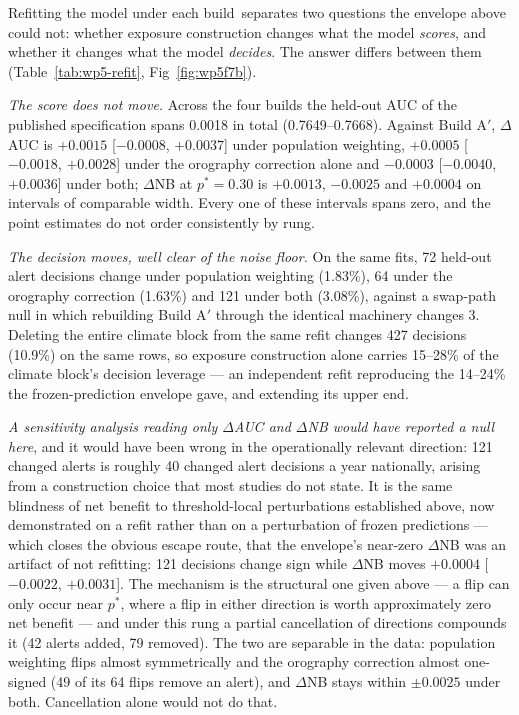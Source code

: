 Refitting the model under each build\,\REBUILD{} separates two questions the envelope above could not: whether exposure construction changes what the model \emph{scores}, and whether it changes what the model \emph{decides}. The answer differs between them (Table~\ref{tab:wp5-refit}, Fig~\ref{fig:wp5f7b}).

\emph{The score does not move.} Across the four builds the held-out AUC of the published specification spans 0.0018 in total (0.7649--0.7668). Against Build A$'$, $\Delta$AUC is $+0.0015$ [$-0.0008$, $+0.0037$] under population weighting, $+0.0005$ [$-0.0018$, $+0.0028$] under the orography correction alone and $-0.0003$ [$-0.0040$, $+0.0036$] under both; $\Delta$NB at $p^*=0.30$ is $+0.0013$, $-0.0025$ and $+0.0004$ on intervals of comparable width. Every one of these intervals spans zero, and the point estimates do not order consistently by rung.

\emph{The decision moves, well clear of the noise floor.} On the same fits, 72 held-out alert decisions change under population weighting (1.83\%), 64 under the orography correction (1.63\%) and 121 under both (3.08\%), against a swap-path null in which rebuilding Build A$'$ through the identical machinery changes 3. Deleting the entire climate block from the same refit changes 427 decisions (10.9\%) on the same rows, so exposure construction alone carries 15--28\% of the climate block's decision leverage --- an independent refit reproducing the 14--24\% the frozen-prediction envelope gave, and extending its upper end.

\emph{A sensitivity analysis reading only $\Delta$AUC and $\Delta$NB would have reported a null here}, and it would have been wrong in the operationally relevant direction: 121 changed alerts is roughly 40 changed alert decisions a year nationally, arising from a construction choice that most studies do not state. It is the same blindness of net benefit to threshold-local perturbations established above, now demonstrated on a refit rather than on a perturbation of frozen predictions --- which closes the obvious escape route, that the envelope's near-zero $\Delta$NB was an artifact of not refitting: 121 decisions change sign while $\Delta$NB moves $+0.0004$ [$-0.0022$, $+0.0031$]. The mechanism is the structural one given above --- a flip can only occur near $p^*$, where a flip in either direction is worth approximately zero net benefit --- and under this rung a partial cancellation of directions compounds it (42 alerts added, 79 removed). The two are separable in the data: population weighting flips almost symmetrically and the orography correction almost one-signed (49 of its 64 flips remove an alert), and $\Delta$NB stays within $\pm0.0025$ under both. Cancellation alone would not do that.

